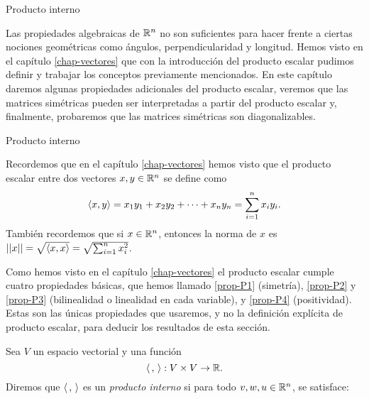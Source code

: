    \begin{chapter}{Producto interno}\label{chap-esp-prod-int}
    

    Las propiedades algebraicas de $\mathbb R^n$ no son suficientes para hacer frente a ciertas nociones geométricas  como  ángulos, perpendicularidad y longitud. Hemos visto en el  capítulo \ref{chap-vectores} que con la introducción del producto escalar pudimos definir y  trabajar  los conceptos previamente mencionados. En  este capítulo daremos algunas propiedades adicionales del producto escalar, veremos que las matrices simétricas pueden ser interpretadas a partir del producto escalar y, finalmente, probaremos que las matrices simétricas son diagonalizables.
    
    
    \begin{section}{Producto interno}\label{seccion-producto-interno}
        
        
   
        
        Recordemos que en
         el  capítulo \ref{chap-vectores} hemos visto que el producto escalar entre dos vectores $x,y \in \mathbb R^n$ se define como
        \begin{equation*}
            \langle x,y\rangle = x_1y_1 + x_2y_2+\cdots+x_ny_n = \sum_{i=1}^{n} x_iy_i.
        \end{equation*}
        También recordemos que si  $x \in \mathbb R^n$,  entonces la norma de $x$ es $||x|| = \sqrt{\langle x,x\rangle} = \sqrt{ \sum_{i=1}^{n} x_i^2}$.
        
        Como hemos visto en  el capítulo \ref{chap-vectores} el producto escalar  cumple cuatro propiedades básicas,  que hemos llamado \ref{prop-P1} (simetría), \ref{prop-P2} y \ref{prop-P3} (bilinealidad o linealidad en cada variable), y \ref{prop-P4} (positividad). Estas son las únicas propiedades que usaremos, y no la definición explícita de producto escalar,  para deducir los resultados de esta sección. 
        
        \begin{definicion} Sea $V$  un espacio  vectorial y  una función
            \begin{equation*}
            \langle \,,\,\rangle: V \times V \to \mathbb R .
            \end{equation*}
            Diremos que $\langle \,,\,\rangle$ es un \textit{producto interno} si para todo $v, w, u \in \mathbb R^n$, se satisface:
            

\end{definicion}
\end{section}
\end{chapter}
